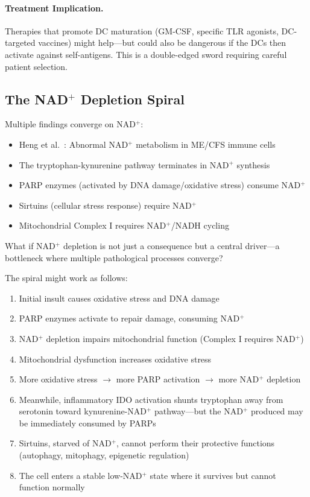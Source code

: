 \paragraph{Treatment Implication.} Therapies that promote DC maturation (GM-CSF, specific TLR agonists, DC-targeted vaccines) might help---but could also be dangerous if the DCs then activate against self-antigens. This is a double-edged sword requiring careful patient selection.

\subsection{The NAD$^+$ Depletion Spiral}

\begin{open_question}
Multiple findings converge on NAD$^+$:
\begin{itemize}
    \item Heng et al.~\cite{heng2025mecfs}: Abnormal NAD$^+$ metabolism in ME/CFS immune cells
    \item The tryptophan-kynurenine pathway terminates in NAD$^+$ synthesis
    \item PARP enzymes (activated by DNA damage/oxidative stress) consume NAD$^+$
    \item Sirtuins (cellular stress response) require NAD$^+$
    \item Mitochondrial Complex I requires NAD$^+$/NADH cycling
\end{itemize}

What if NAD$^+$ depletion is not just a consequence but a central driver---a bottleneck where multiple pathological processes converge?

The spiral might work as follows:
\begin{enumerate}
    \item Initial insult causes oxidative stress and DNA damage
    \item PARP enzymes activate to repair damage, consuming NAD$^+$
    \item NAD$^+$ depletion impairs mitochondrial function (Complex I requires NAD$^+$)
    \item Mitochondrial dysfunction increases oxidative stress
    \item More oxidative stress $\rightarrow$ more PARP activation $\rightarrow$ more NAD$^+$ depletion
    \item Meanwhile, inflammatory IDO activation shunts tryptophan away from serotonin toward kynurenine-NAD$^+$ pathway---but the NAD$^+$ produced may be immediately consumed by PARPs
    \item Sirtuins, starved of NAD$^+$, cannot perform their protective functions (autophagy, mitophagy, epigenetic regulation)
    \item The cell enters a stable low-NAD$^+$ state where it survives but cannot function normally
\end{enumerate}
\end{open_question}


